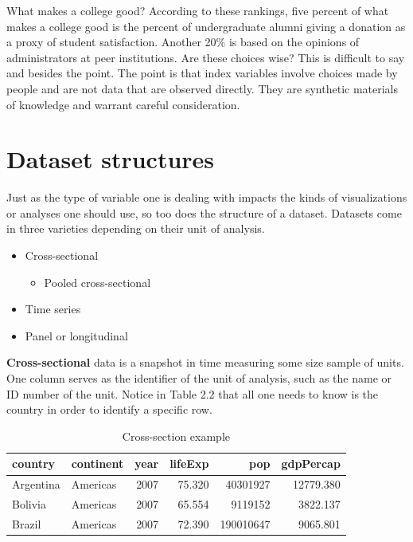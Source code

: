 \documentclass[
]{book}
\providecommand{\tightlist}{%
  \setlength{\itemsep}{0pt}\setlength{\parskip}{0pt}}
\begin{document}
What makes a college good? According to these rankings, five percent of what makes a college good is the percent of undergraduate alumni giving a donation as a proxy of student satisfaction. Another 20\% is based on the opinions of administrators at peer institutions. Are these choices wise? This is difficult to say and besides the point. The point is that index variables involve choices made by people and are not data that are observed directly. They are synthetic materials of knowledge and warrant careful consideration.

\hypertarget{dataset-structures}{%
\section{Dataset structures}\label{dataset-structures}}

Just as the type of variable one is dealing with impacts the kinds of visualizations or analyses one should use, so too does the structure of a dataset. Datasets come in three varieties depending on their unit of analysis.

\begin{itemize}
\tightlist
\item
  Cross-sectional

  \begin{itemize}
  \tightlist
  \item
    Pooled cross-sectional
  \end{itemize}
\item
  Time series
\item
  Panel or longitudinal
\end{itemize}

\textbf{Cross-sectional} data is a snapshot in time measuring some size sample of units. One column serves as the identifier of the unit of analysis, such as the name or ID number of the unit. Notice in Table 2.2 that all one needs to know is the country in order to identify a specific row.

\begin{table}

\caption{\label{tab:cross-sec-fig}Cross-section example}
\centering
\begin{tabular}[t]{l|l|r|r|r|r}
\hline
country & continent & year & lifeExp & pop & gdpPercap\\
\hline
Argentina & Americas & 2007 & 75.320 & 40301927 & 12779.380\\
\hline
Bolivia & Americas & 2007 & 65.554 & 9119152 & 3822.137\\
\hline
Brazil & Americas & 2007 & 72.390 & 190010647 & 9065.801\\
\hline
\end{tabular}
\end{table}
\end{document}
